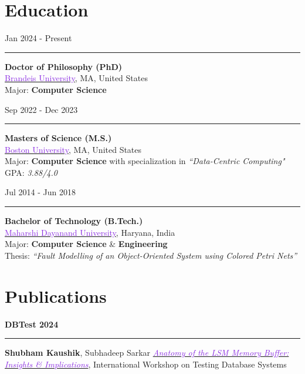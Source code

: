 \documentclass[10pt,a4paper,calibri]{moderncv}
\newcommand{\beforesection}{\vspace{-0.5em}}
\newcommand{\mediumspace}{\vspace{0.5em}}
\newcommand{\education}[2]{
  \noindent
  \begin{minipage}[c]{0.20\textwidth}
    \hfill
    #1
  \end{minipage}%
  \hspace{0.01\textwidth}
  \begin{minipage}[c]{0.02\textwidth}
    \textcolor{lightgray}{\rule{1pt}{1.6cm}}
  \end{minipage}%
  \begin{minipage}[c]{0.80\textwidth}
    \raggedright{
    #2
    }
  \end{minipage}%
}
\newcommand{\publications}[2]{
  \noindent
  \begin{minipage}[c]{0.15\textwidth}
    \centering
      \textbf{#1}
  \end{minipage}%
  \hspace{0.01\textwidth}
  \begin{minipage}[c]{0.02\textwidth}
    \textcolor{lightgray}{\rule{1pt}{0.75cm}}
  \end{minipage}%
  \begin{minipage}[c]{0.80\textwidth}
    \raggedright{
    #2
    }
  \end{minipage}%
}
\begin{document}
\section{Education}
\noindent
\begin{minipage}[c]{0.20\textwidth}
  \hfill
  Jan 2024 \-- Present
\end{minipage}%
\hspace{0.01\textwidth}
\begin{minipage}[c]{0.02\textwidth}
  \textcolor{lightgray}{\rule{1pt}{1.2cm}}
\end{minipage}%
\begin{minipage}[c]{0.80\textwidth}
  \raggedright{
    \textbf{Doctor of Philosophy (PhD)}\\
    \href{https://www.brandeis.edu/}{\textcolor{blueviolet}{Brandeis University}}, MA, United States\\
    Major: \textbf{Computer Science}\\
  }
\end{minipage}%

\mediumspace

\education{Sep 2022 \-- Dec 2023}
{
  \textbf{Masters of Science (M.S.)}\\
  \href{https://www.bu.edu/}{\textcolor{blueviolet}{Boston University}}, MA, United States\\
  Major: \textbf{Computer Science} with specialization in \textit{“Data-Centric Computing"}\\
  GPA: \textit{3.88/4.0}
}

\mediumspace

\education{Jul 2014 \-- Jun 2018}
{
  \textbf{Bachelor of Technology (B.Tech.)}\\
  \href{https://mdu.ac.in/}{\textcolor{blueviolet}{Maharshi Dayanand University}}, Haryana, India\\
  Major: \textbf{Computer Science} \& \textbf{Engineering}\\
  Thesis: \textit{“Fault Modelling of an Object-Oriented System using Colored Petri Nets”}\\
}

\beforesection

\section{Publications}
\publications{DBTest 2024}{\textbf{Shubham Kaushik}, Subhadeep Sarkar \href{https://doi.org/10.1145/3662165.3662766}{\textit{\textcolor{blueviolet}{Anatomy 
of the LSM Memory Buffer: Insights \& Implications}}}, International Workshop on Testing Database Systems}
\end{document}
